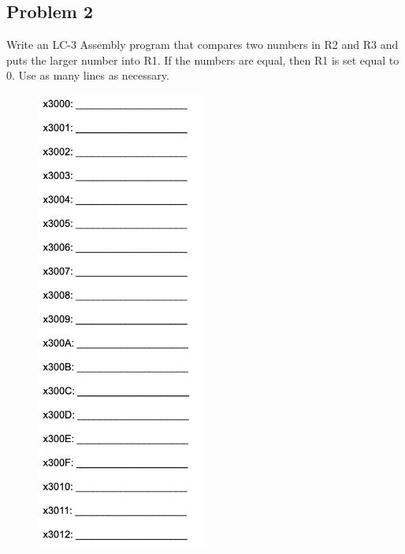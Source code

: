 \documentclass{article}
\begin{document}
\subsection*{Problem 2}
Write an LC-3 Assembly program that compares two numbers in R2 and R3 and puts the larger number into R1. If the numbers are equal, then R1 is set equal  to 0. Use as many lines as necessary.
\begin{figure}[!h]
    \centering
    \includegraphics[width=0.5\textwidth]{figures/lc3_q2.png}
\end{figure}

\newpage
\end{document}
